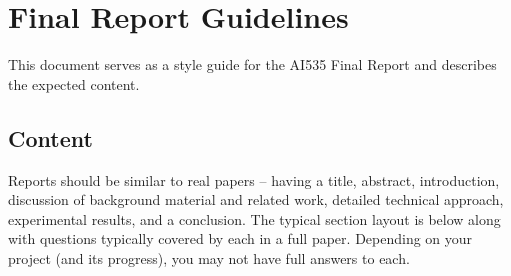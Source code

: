 \documentclass[10pt,twocolumn,letterpaper]{article}
\begin{document}
\newpage \; \newpage

\section{Final Report Guidelines}
\label{sec:intro}

This document serves as a style guide for the AI535 Final Report and describes the expected content. 

\subsection{Content} 
Reports should be similar to real papers -- having a title, abstract, introduction, discussion of background material and related work, detailed technical approach, experimental results, and a conclusion. The typical section layout is below along with questions typically covered by each in a full paper. Depending on your project (and its progress), you may not have full answers to each.\\[-5pt]
\end{document}
